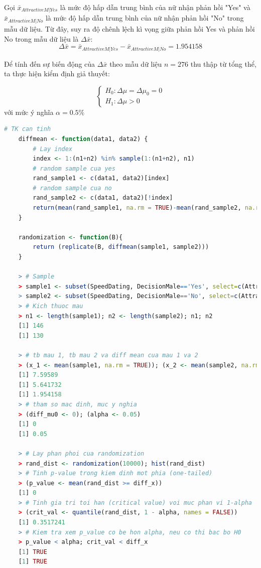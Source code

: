 \documentclass[a4paper,12pt]{article}
\begin{document}
	Gọi $\bar{x}_{AttractiveM|Yes}$ là mức độ hấp dẫn trung bình của nữ nhận phản hồi "Yes" và $\bar{x}_{AttractiveM|No}$ là mức độ hấp dẫn trung bình của nữ nhận phản hồi "No" trong mẫu dữ liệu. Từ đây, suy ra độ chênh lệch kì vọng giữa phản hồi Yes và phản hồi No trong mẫu dữ liệu là $\Delta\bar{x}$:
	$$\Delta\bar{x} = \bar{x}_{AttractiveM|Yes} - \bar{x}_{AttractiveM|No} = 1.954158$$
	
	Để tính đến sự biến động của $\Delta\bar{x}$ theo mẫu dữ liệu $n = 276$ thu thập từ tổng thể, ta thực hiện kiểm định giả thuyết:
	
	\begin{equation*}
	\begin{cases}
	H_0: \Delta\mu = \Delta\mu_0 = 0\\
	H_1: \Delta\mu > 0
	\end{cases}
	\end{equation*}
	với mức ý nghĩa $\alpha = 0.5\%$
	
	\begin{lstlisting}[language=R]
	# TK can tinh
	diffmean <- function(data1, data2) {
		# Lay index
		index <- 1:(n1+n2) %in% sample(1:(n1+n2), n1)
		# random sample cua yes
		rand_sample1 <- c(data1, data2)[index]
		# random sample cua no
		rand_sample2 <- c(data1, data2)[!index]
		return(mean(rand_sample1, na.rm = TRUE)-mean(rand_sample2, na.rm = TRUE))
	}
	
	randomization <- function(B){
		return (replicate(B, diffmean(sample1, sample2)))
	}
	
	> # Sample
	> sample1 <- subset(SpeedDating, DecisionMale=='Yes', select=c(AttractiveM))[[1]]; 
	> sample2 <- subset(SpeedDating, DecisionMale=='No', select=c(AttractiveM))[[1]];
	> # Kich thuoc mau
	> n1 <- length(sample1); n2 <- length(sample2); n1; n2
	[1] 146
	[1] 130
	 
	> # tb mau 1, tb mau 2 va diff mean cua mau 1 va 2
	> (x_1 <- mean(sample1, na.rm = TRUE)); (x_2 <- mean(sample2, na.rm = TRUE)); (diff_x <- x_1 - x_2)
	[1] 7.59589
	[1] 5.641732
	[1] 1.954158
	> # tham so mac dinh, muc y nghia
	> (diff_mu0 <- 0); (alpha <- 0.05)
	[1] 0
	[1] 0.05
	
	> # Lay phan phoi cua randomization
	> rand_dist <- randomization(10000); hist(rand_dist)
	> # Tinh p-value trong kiem dinh mot phia (one-tailed)
	> (p_value <- mean(rand_dist >= diff_x))
	[1] 0
	> # Tinh gia tri toi han (critical value) voi muc phan vi 1-alpha
	> (crit_val <- quantile(rand_dist, 1 - alpha, names = FALSE))
	[1] 0.3517241
	> # Kiem tra xem p_value co be hon alpha, neu co thi bac bo H0
	> p_value < alpha; crit_val < diff_x
	[1] TRUE
	[1] TRUE
	\end{lstlisting}
	
\end{document}

